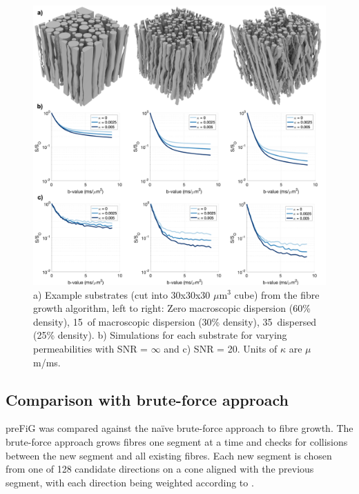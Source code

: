 \begin{figure}[h!]
  \centering
  \includegraphics[width=\textwidth]{figures/ipmi_implementation/substrates_and_signals_otherlabels.png}
  \caption[Examples of generate WM numerical phantoms and simulated dMRI signals]{\small a) Example substrates (cut into 30x30x30 $\mu$m$^3$ cube) from the fibre growth algorithm, left to right:  Zero macroscopic dispersion (60\% density), 15\degree\ of macroscopic dispersion (30\% density), 35\degree\ dispersed (25\% density). b) Simulations for each substrate for varying permeabilities with SNR = $\infty$  and c) SNR = 20. Units of $\kappa$ are $\mu$m/ms.}
  \label{fig:ipmi_substrates_signals}
\end{figure}

\subsection{Comparison with brute-force approach}
\label{sec:impi_bruteforce}
\ac{preFiG} was compared against the na\"ive brute-force approach to fibre growth.
The brute-force approach grows fibres one segment at a time and checks for collisions between the new segment and all existing fibres.
Each new segment is chosen from one of 128 candidate directions on a cone aligned with the previous segment, with each direction being weighted according to .

